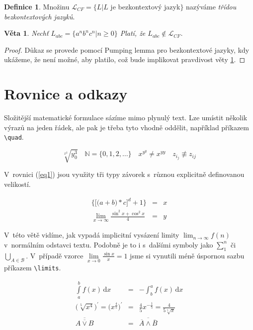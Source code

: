 \documentclass[a4paper, twocolumn, 11pt]{article}
\theoremstyle{definition}
\newtheorem{definition}{Definice}[section]
\theoremstyle{plain}
\theoremstyle{plain}
\newtheorem{sentence}{Věta}
\begin{document}
\begin{definition}
Množinu $\mathcal{L}_{CF} = \{L|L$ je bezkontextový jazyk$\}$ nazýváme \textit{třídou bezkontextových jazyků}.
\end{definition}

\begin{sentence}\label{sent}
Nechť $L_{abc} = \{a^nb^nc^n|n \geq 0\}$ Platí, že $L_{abc} \not\in \mathcal{L}_{CF}$.
\end{sentence}

\begin{proof}
Důkaz se provede pomocí Pumping lemma pro bezkontextové jazyky, kdy ukážeme, že není možné, aby platilo, což bude implikovat pravdivost věty \ref{sent}.
\end{proof}

\section{Rovnice a odkazy}

Složitější matematické formulace sázíme mimo plynulý text. Lze umístit několik výrazů na jeden řádek, ale pak je třeba tyto vhodně oddělit, například příkazem \verb|\quad|.

$$\sqrt[x^2]{y^3_0} \quad \mathbb{N} = \{0,1,2,\ldots\} \quad x^{y^y} \neq x^{yy} \quad z_{i_j} \not\equiv z_{ij}$$

V~rovnici (\ref{eq1}) jsou využity tři typy závorek s~různou explicitně definovanou velikostí.

\begin{eqnarray}
\bigg\{\Big[\big(a+b\big)*c\Big]^d+1\bigg\} & = & x\label{eq1}\\
\lim_{x\rightarrow\infty} \frac{\sin^2x+\cos^2x}{4} & = & y\nonumber
\end{eqnarray}

V~této větě vidíme, jak vypadá implicitní vysázení limity $\lim_{n\rightarrow\infty}f(n)$ v~normálním odstavci textu. Podobně je to i s~dalšími symboly jako $\sum^n_1$ či $\bigcup_{A\in \mathcal{B}}$. V~případě vzorce $\lim\limits _{x\rightarrow 0} \frac{\sin x}{x} = 1$ jsme si vynutili méně úspornou sazbu příkazem \verb|\limits|.

\begin{eqnarray}
\int\limits_a^b f(x)\,\mathrm{d}x & = & - \int_b^a f(x)\,\mathrm{d}x\\
\Big(\sqrt[5]{x^4}\Big)^\prime = \Big(x^{\frac{4}{5}}\Big)^\prime & = & \frac{4}{5}x^{-\frac{1}{5}} = \frac{4}{5\sqrt[5]{x}}\\
\overline{\overline{A \lor B}} & = & \overline{\overline{A} \land \overline{B}}
\end{eqnarray}
\end{document}
